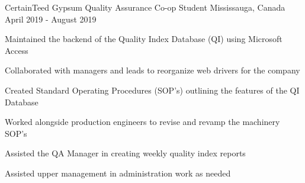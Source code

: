 


\begin{cventries}


\cventry
{CertainTeed Gypsum} %
{Quality Assurance Co-op Student} %
{Mississauga, Canada} %
{April 2019 - August 2019} %
{ %
\begin{cvitems}
\item {Maintained the backend of the Quality Index Database (QI) using Microsoft Access}
\item {Collaborated with managers and leads to reorganize web drivers for the company}
\item {Created Standard Operating Procedures (SOP's) outlining the features of the QI Database }
\item {Worked alongside production engineers to revise and revamp the machinery SOP's}
\item {Assisted the QA Manager in creating weekly quality index reports}
\item {Assisted upper management in administration work as needed}
\end{cvitems}
}



\end{cventries}